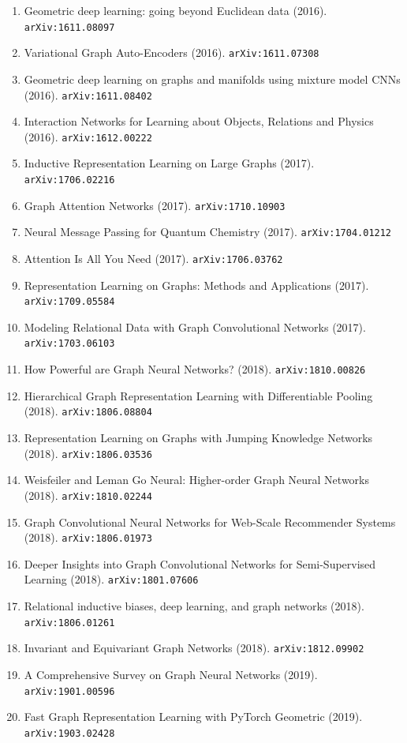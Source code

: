 \documentclass[11pt]{article}
\begin{document}
\begin{enumerate}
  \item Geometric deep learning: going beyond Euclidean data (2016). \texttt{arXiv:1611.08097}
  \item Variational Graph Auto-Encoders (2016). \texttt{arXiv:1611.07308}
  \item Geometric deep learning on graphs and manifolds using mixture model CNNs (2016). \texttt{arXiv:1611.08402}
  \item Interaction Networks for Learning about Objects, Relations and Physics (2016). \texttt{arXiv:1612.00222}
  \item Inductive Representation Learning on Large Graphs (2017). \texttt{arXiv:1706.02216}
  \item Graph Attention Networks (2017). \texttt{arXiv:1710.10903}
  \item Neural Message Passing for Quantum Chemistry (2017). \texttt{arXiv:1704.01212}
  \item Attention Is All You Need (2017). \texttt{arXiv:1706.03762}
  \item Representation Learning on Graphs: Methods and Applications (2017). \texttt{arXiv:1709.05584}
  \item Modeling Relational Data with Graph Convolutional Networks (2017). \texttt{arXiv:1703.06103}
  \item How Powerful are Graph Neural Networks? (2018). \texttt{arXiv:1810.00826}
  \item Hierarchical Graph Representation Learning with Differentiable Pooling (2018). \texttt{arXiv:1806.08804}
  \item Representation Learning on Graphs with Jumping Knowledge Networks (2018). \texttt{arXiv:1806.03536}
  \item Weisfeiler and Leman Go Neural: Higher-order Graph Neural Networks (2018). \texttt{arXiv:1810.02244}
  \item Graph Convolutional Neural Networks for Web-Scale Recommender Systems (2018). \texttt{arXiv:1806.01973}
  \item Deeper Insights into Graph Convolutional Networks for Semi-Supervised
  Learning (2018). \texttt{arXiv:1801.07606}
  \item Relational inductive biases, deep learning, and graph networks (2018). \texttt{arXiv:1806.01261}
  \item Invariant and Equivariant Graph Networks (2018). \texttt{arXiv:1812.09902}
  \item A Comprehensive Survey on Graph Neural Networks (2019). \texttt{arXiv:1901.00596}
  \item Fast Graph Representation Learning with PyTorch Geometric (2019). \texttt{arXiv:1903.02428}

\end{enumerate}
\end{document}
